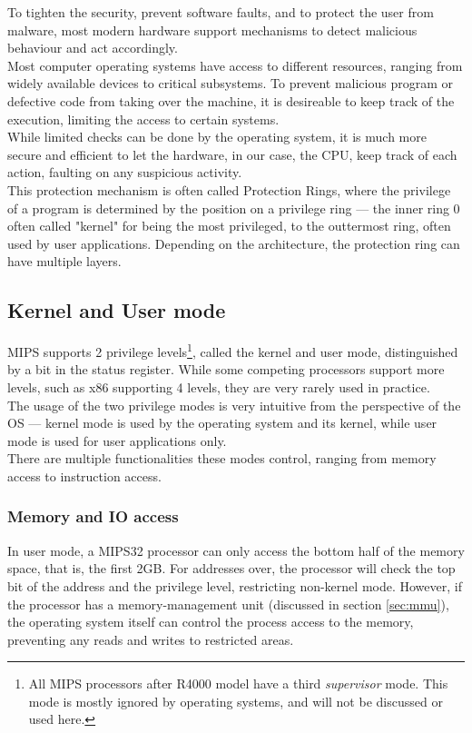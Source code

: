 \label{sec:privileges}
To tighten the security, prevent software faults, and to protect the user from
malware, most modern hardware support mechanisms to detect malicious behaviour
and act accordingly.\\
Most computer operating systems have access to different resources, ranging from
widely available devices to critical subsystems. To prevent malicious
program or defective code from taking over the machine, it is desireable to keep
track of the execution, limiting the access to certain systems.\\
While limited checks can be done by the operating system, it is much more
secure and efficient to let the hardware, in our case, the CPU, keep track
of each action, faulting on any suspicious activity.\\
This protection mechanism is often called Protection Rings, where the privilege
of a program is determined by the position on a privilege ring --- the inner ring 0
often called "kernel" for being the most privileged, to the outtermost ring,
often used by user applications\cite{see_mips_run}. Depending on the architecture, the protection
ring can have multiple layers.

\subsection{Kernel and User mode}
MIPS supports 2 privilege levels\footnote{All MIPS processors after R4000 model have a
third \textit{supervisor} mode. This mode is mostly ignored by operating systems,
and will not be discussed or used here.\cite{see_mips_run}}, called the kernel and user mode,
distinguished by a bit in the status register. While some competing processors support
more levels, such as x86 supporting 4\cite{intelmanual} levels, they are very
rarely used in practice.\\
The usage of the two privilege modes is very intuitive from the perspective of
the OS --- kernel mode is used
by the operating system and its kernel, while user mode is used for user
applications only.\\
There are multiple functionalities these modes control, ranging from memory access
to instruction access.

\subsubsection{Memory and IO access}
In user mode, a MIPS32 processor can only access the bottom half of the memory
space, that is, the first 2GB. For addresses over, the processor will check
the top bit of the address and the privilege level, restricting non-kernel mode.
However, if the processor has a memory-management unit (discussed in section \ref{sec:mmu}),
the operating system itself can control the process access to the memory, preventing
any reads and writes to restricted areas.

